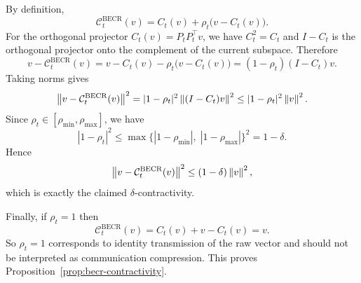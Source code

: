 By definition,
\[
\mathcal C_t^{\mathrm{BECR}}(v)=C_t(v)+\rho_t\bigl(v-C_t(v)\bigr).
\]
For the orthogonal projector $C_t(v)=P_tP_t^\top v$, we have
$C_t^2=C_t$ and $I-C_t$ is the orthogonal projector onto the complement of the
current subspace. Therefore
\[
v-\mathcal C_t^{\mathrm{BECR}}(v)
=
v-C_t(v)-\rho_t\bigl(v-C_t(v)\bigr)
=
(1-\rho_t)(I-C_t)v.
\]
Taking norms gives
\[
\left\lVert v-\mathcal C_t^{\mathrm{BECR}}(v) \right\rVert^2
=
|1-\rho_t|^2 \left\lVert (I-C_t)v \right\rVert^2
\le
|1-\rho_t|^2 \left\lVert v \right\rVert^2.
\]
Since $\rho_t\in[\rho_{\min},\rho_{\max}]$, we have
\[
|1-\rho_t|^2
\le
\max\{|1-\rho_{\min}|,\;|1-\rho_{\max}|\}^2
=
1-\delta.
\]
Hence
\[
\left\lVert v-\mathcal C_t^{\mathrm{BECR}}(v) \right\rVert^2
\le
(1-\delta)\left\lVert v \right\rVert^2,
\]
which is exactly the claimed $\delta$-contractivity.

Finally, if $\rho_t=1$ then
\[
\mathcal C_t^{\mathrm{BECR}}(v)=C_t(v)+v-C_t(v)=v.
\]
So $\rho_t=1$ corresponds to identity transmission of the raw vector and
should not be interpreted as communication compression. This proves
Proposition~\ref{prop:becr-contractivity}.
